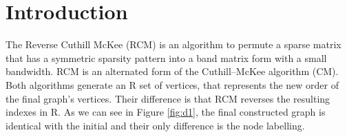 \section{Introduction}
The Reverse Cuthill McKee (RCM) is an algorithm to permute a sparse matrix that has a symmetric sparsity pattern into a band matrix form with a small bandwidth. RCM is an alternated form of the Cuthill–McKee algorithm (CM). Both algorithms generate an R set of vertices, that represents the new order of the final graph's vertices. Their difference is that RCM reverses the resulting indexes in R. As we can see in Figure \ref{fig:d1}, the final constructed graph is identical with the initial and their only difference is the node labelling. \par
\bigbreak

